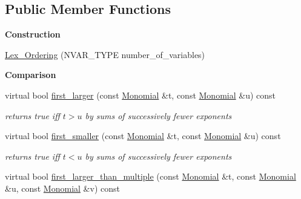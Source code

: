 \subsection*{Public Member Functions}
\begin{Indent}\textbf{ Construction}\par
\begin{DoxyCompactItemize}
\item 
\hyperlink{class_lex___ordering_a35968aecc4009c0d15bfd357ccf74a5f}{Lex\+\_\+\+Ordering} (N\+V\+A\+R\+\_\+\+T\+Y\+PE number\+\_\+of\+\_\+variables)
\end{DoxyCompactItemize}
\end{Indent}
\begin{Indent}\textbf{ Comparison}\par
\begin{DoxyCompactItemize}
\item 
\mbox{\label{class_lex___ordering_a014be6086437b0c61974b9dc300f6d39}} 
virtual bool \hyperlink{class_lex___ordering_a014be6086437b0c61974b9dc300f6d39}{first\+\_\+larger} (const \hyperlink{class_monomial}{Monomial} \&t, const \hyperlink{class_monomial}{Monomial} \&u) const
\begin{DoxyCompactList}\small\item\em returns {\ttfamily true} iff $t>u$ by sums of successively fewer exponents \end{DoxyCompactList}\item 
\mbox{\label{class_lex___ordering_a4bd884b31cd9756e7d3cf6825d5a3210}} 
virtual bool \hyperlink{class_lex___ordering_a4bd884b31cd9756e7d3cf6825d5a3210}{first\+\_\+smaller} (const \hyperlink{class_monomial}{Monomial} \&t, const \hyperlink{class_monomial}{Monomial} \&u) const
\begin{DoxyCompactList}\small\item\em returns {\ttfamily true} iff $t< u$ by sums of successively fewer exponents \end{DoxyCompactList}\item 
\mbox{\label{class_lex___ordering_aea0bc68f4bbb48a9299025eba8704449}} 
virtual bool \hyperlink{class_lex___ordering_aea0bc68f4bbb48a9299025eba8704449}{first\+\_\+larger\+\_\+than\+\_\+multiple} (const \hyperlink{class_monomial}{Monomial} \&t, const \hyperlink{class_monomial}{Monomial} \&u, const \hyperlink{class_monomial}{Monomial} \&v) const

\end{DoxyCompactItemize}
\end{Indent}
